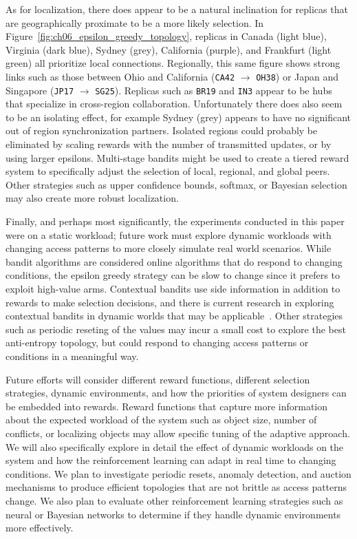 As for localization, there does appear to be a natural inclination for
replicas that are geographically proximate to be a more likely selection.
In Figure~\ref{fig:ch06_epsilon_greedy_topology}, replicas in Canada (light blue),
Virginia (dark blue), Sydney (grey), California (purple), and Frankfurt
(light green) all prioritize local connections.
Regionally, this same figure shows strong links such as those between Ohio
and California (\texttt{CA42} $\rightarrow$ \texttt{OH38}) or Japan and
Singapore (\texttt{JP17} $\rightarrow$ \texttt{SG25}).
Replicas such as \texttt{BR19} and \texttt{IN3} appear to be hubs that
specialize in cross-region collaboration.
Unfortunately there does also seem to be an isolating effect, for example
Sydney (grey) appears to have no significant out of region synchronization
partners.
Isolated regions could probably be eliminated by scaling rewards with
the number of transmitted updates, or by using larger epsilons.
Multi-stage bandits might be used to create a tiered reward system to
specifically adjust the selection of local, regional, and global peers.
Other strategies such as upper confidence bounds, softmax, or Bayesian
selection may also create more robust localization.

Finally, and perhaps most significantly, the experiments conducted in
this paper were on a static workload; future work must explore dynamic
workloads with changing access patterns to more closely simulate real
world scenarios.
While bandit algorithms are considered online algorithms that do respond
to changing conditions, the epsilon greedy strategy can be slow to change
since it prefers to exploit high-value arms.
Contextual bandits use side information in addition to rewards to make
selection decisions, and there is current research in exploring contextual
bandits in dynamic worlds that may be applicable~\cite{contextual_bandits}.
Other strategies such as periodic reseting of the values may incur a small
cost to explore the best anti-entropy topology, but could respond to changing
access patterns or conditions in a meaningful way.

Future efforts will consider different reward functions, different selection
strategies, dynamic environments, and how the priorities of system designers
can be embedded into rewards.
Reward functions that capture more information about the expected workload of
the system such as object size, number of conflicts, or localizing objects
may allow specific tuning of the adaptive approach.
We will also specifically explore in detail the effect of dynamic workloads
on the system and how the reinforcement learning can adapt in real time to
changing conditions.
We plan to investigate periodic resets, anomaly detection, and auction
mechanisms to produce efficient topologies that are not brittle as access
patterns change.
We also plan to evaluate other reinforcement learning strategies such as
neural or Bayesian networks to determine if they handle dynamic environments
more effectively.

